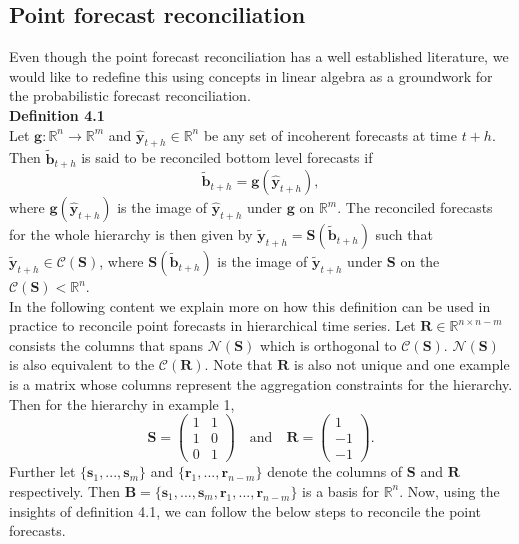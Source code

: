 \documentclass[a4paper, 11pt]{article}
\begin{document}
\subsection{Point forecast reconciliation}

Even though the point forecast reconciliation has a well established literature, we would like to redefine this using concepts in linear algebra as a groundwork for the probabilistic forecast reconciliation. \\


\noindent
\textbf{Definition 4.1}\\
\noindent
Let $\bm{g}:\bm{\mathbb{R}}^n \rightarrow \bm{\mathbb{R}}^m $ and $\hat{\bm{y}}_{t+h} \in \bm{\mathbb{R}}^n$ be any set of incoherent forecasts at time $t+h$. Then $\tilde{\bm{b}}_{t+h}$ is said to be reconciled bottom level forecasts if 
\begin{equation}
\tilde{\bm{b}}_{t+h}=\bm{g}(\hat{\bm{y}}_{t+h}),
\end{equation}
\noindent
where $\bm{g}(\hat{\bm{y}}_{t+h})$ is the image of $\hat{\bm{y}}_{t+h}$ under $\bm{g}$ on $\bm{\mathbb{R}}^m$. The reconciled forecasts for the whole hierarchy is then given by $\tilde{\bm{y}}_{t+h}=\bm{S}(\tilde{\bm{b}}_{t+h})$ such that $\tilde{\bm{y}}_{t+h} \in \mathscr{C}(\bm{S})$, where $\bm{S}(\tilde{\bm{b}}_{t+h})$ is the image of $\tilde{\bm{y}}_{t+h}$ under $\bm{S}$ on the $\mathscr{C}(\bm{S}) < \bm{\mathbb{R}}^n$.\\

\noindent
In the following content we explain more on how this definition can be used in practice to reconcile point forecasts in hierarchical time series. Let $\bm{R} \in \bm{\mathbb{R}}^{n \times n-m}$ consists the columns that spans $\mathscr{N}(\bm{S})$ which is orthogonal to $\mathscr{C}(\bm{S})$. $\mathscr{N}(\bm{S})$ is also equivalent to the $\mathscr{C}(\bm{R})$. Note that $\bm{R}$ is also not unique and one example is a matrix whose columns represent the aggregation constraints for the hierarchy. Then for the hierarchy in example 1, $$ \mathbold{S} = \begin{pmatrix} 1& 1 \\ 1 & 0 \\ 0&1 \end{pmatrix} \quad \text{and} \quad \mathbold{R} = \begin{pmatrix}  1 \\ -1 \\ -1 \end{pmatrix}.$$ 
\noindent
Further let $\{\bm{s}_1,...,\bm{s}_m\}$ and $\{\bm{r}_1,...,\bm{r}_{n-m}\}$ denote the columns of $\bm{S}$ and $\bm{R}$ respectively. Then $\bm{B}=\{\bm{s}_1,...,\bm{s}_m, \bm{r}_1,...,\bm{r}_{n-m}\}$ is a basis for $\bm{\mathbb{R}}^n$. Now, using the insights of definition 4.1, we can follow the below steps to reconcile the point forecasts.\\
\end{document}
